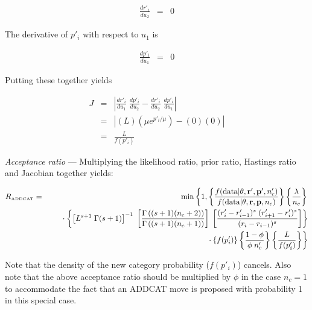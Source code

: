 \documentclass[12pt]{article}
\newcommand{\ncat}{n_c}
\newcommand{\newprobmean}{\mu}
\begin{document}
\begin{eqnarray*}
\frac{d r'_i}{d u_2} & = & 0
\end{eqnarray*}

The derivative of $p'_i$ with respect to $u_1$ is

\begin{eqnarray*}
\frac{d p'_i}{d u_1} & = & 0
\end{eqnarray*}

Putting these together yields

\begin{eqnarray*}
J & = & \left| \frac{d r'_i}{d u_1} \; \frac{d p'_i}{d u_2} - \frac{d r'_i}{d u_2} \; \frac{d p'_i}{d u_1} \right| \\
& = & \left| \left( L \right) \left( \newprobmean e^{p'_i/\newprobmean} \right) - \left( 0 \right) \left( 0 \right) \right| \\
& = & \frac{L}{f(p'_i)} 
\end{eqnarray*}

{\em Acceptance ratio} --- Multiplying the likelihood ratio, prior ratio, Hastings ratio and Jacobian together yields:

\begin{eqnarray*}
R_{\mbox{\tiny ADDCAT}} & = & \min \left\{1, 
\left\{ 
  \frac{f(\mbox{data} | {\bf \theta}, {\bf r}', {\bf p}', \ncat')}{f(\mbox{data} | {\bf \theta}, {\bf r}, {\bf p}, \ncat)} 
\right\}
\left\{ 
  \frac{\lambda}{\ncat} 
\right\} \right. \\
& & \rule{.2in}{.0in} \cdot 
\left\{ 
  \left[ L^{s+1} \; \Gamma(s+1)\right]^{-1} \; 
    \left[ \frac{\Gamma\left( (s+1) (\ncat + 2) \right)}{\Gamma\left( (s+1) (\ncat + 1) \right)} \right] \;
    \left[ \frac{(r'_i - r'_{i-1})^s \; (r'_{i+1} - r'_i)^s}{(r_i - r_{i-1})^s} \right]
\right\} \\
& & \left. \rule{.2in}{.0in} \cdot 
\left\{ 
  f(p'_i)
\right\} 
\left\{ 
  \frac{1-\phi}{\phi \; \ncat'} 
\right\}
\left\{ 
  \frac{L}{f(p'_i)}
\right\}
\right\}
\end{eqnarray*}

Note that the density of the new category probability ($f(p'_i)$) cancels. Also note that the above acceptance ratio should be multiplied by $\phi$ in the case $\ncat = 1$ to accommodate the fact that an ADDCAT move is proposed with probability 1 in this special case.

\end{document}

